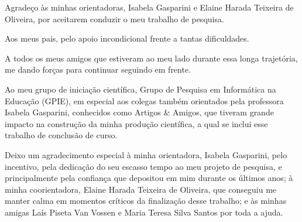 \begin{agradecimentos}
Agradeço às minhas orientadoras, Isabela Gasparini e Elaine Harada Teixeira de Oliveira, por aceitarem conduzir o meu trabalho de pesquisa.

Aos meus pais, pelo apoio incondicional frente a tantas dificuldades.

A todos os meus amigos que estiveram ao meu lado durante essa longa trajetória, me dando forças para continuar seguindo em frente.

Ao meu grupo de iniciação científica, Grupo de Pesquisa em Informática na Educação (GPIE), em especial aos colegas também orientados pela professora Isabela Gasparini, conhecidos como Artigos \& Amigos, que tiveram grande impacto na construção da minha produção científica, a qual se inclui esse trabalho de conclusão de curso. %

Deixo um agradecimento especial à minha orientadora, Isabela Gasparini, pelo incentivo, pela dedicação do seu escasso tempo ao meu projeto de pesquisa, e principalmente pela confiança que depositou em mim durante os últimos anos; à minha coorientadora, Elaine Harada Teixeira de Oliveira, que conseguiu me manter calma em momentos críticos da finalização desse trabalho; e às minhas amigas Laís Piseta Van Vossen e Maria Teresa Silva Santos por toda a ajuda.


\end{agradecimentos}

